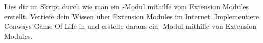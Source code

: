 \begin{aufg_schw}
  Lies dir im Skript durch wie man ein \Python-Modul mithilfe vom Extension Modules erstellt.
  Vertiefe dein Wissen über Extension Modules im Internet.
  Implementiere Conways Game Of Life in \C und erstelle daraus ein \Python-Modul mithilfe von Extension Modules.
\end{aufg_schw}
